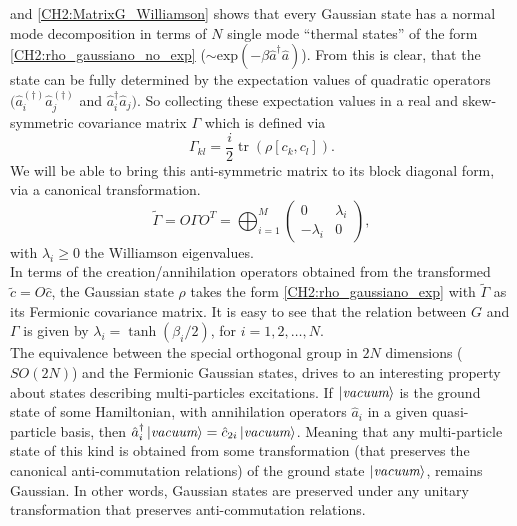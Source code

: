 and \eqref{CH2:MatrixG_Williamson} shows that every Gaussian state has a normal mode decomposition in terms of $N$ single mode ``thermal states'' of the form \eqref{CH2:rho_gaussiano_no_exp} ($\sim \text{exp}(-\beta \hat{a}^{\dagger}\hat{a})$)\cite{kraus_pairing_2009}. From this is clear, that the state can be fully determined by the expectation values of quadratic operators $(\hat{a}_i^{(\dagger)}\hat{a}_j^{(\dagger)}$ and  $\hat{a}^{\dagger}_i\hat{a}_j)$. So collecting these expectation values in a real and skew-symmetric covariance matrix $\Gamma$ which is defined via
\begin{equation}
\Gamma_{k l}=\frac{i}{2} \operatorname{tr}\left(\rho\left[c_{k}, c_{l}\right]\right).
\label{CH2:Cov_matrix_elements}
\end{equation}
\indent We will be able to bring this anti-symmetric matrix to its block diagonal form, via a canonical transformation.
\begin{equation}
\tilde{\Gamma} = O \Gamma O^{T}=\bigoplus_{i=1}^{M}\left(\begin{array}{cc}
0 & \lambda_{i} \\
-\lambda_{i} & 0
\end{array}\right),
\label{CH2:Williamson_Cov_fermionic_matrix}
\end{equation}
with $\lambda_i\geq 0$ the Williamson eigenvalues.\\
In terms of the creation/annihilation operators obtained from the transformed $\tilde{c}=O\hat{c}$, the Gaussian state $\rho$ takes the form \eqref{CH2:rho_gaussiano_exp} with $\tilde{\Gamma}$ as its Fermionic covariance matrix. It is easy to see that the relation between $G$ and $\Gamma$ is given by $\lambda_{i} = \tanh{\left(\beta_{i}/2\right)}$, for $i=1,2,\ldots,N$\cite{kraus_pairing_2009}. \\

\indent The equivalence between the special orthogonal group in $2N$ dimensions ($SO(2N)$) and the Fermionic Gaussian states, drives to an interesting  property about states describing multi-particles excitations. If $\mathinner{|{\textit{vacuum}}\rangle}$ is the ground state of some Hamiltonian, with annihilation operators $\hat{a}_{i}$ in a given quasi-particle basis, then $\hat{a}_{i}^{\dagger}\mathinner{|{\textit{vacuum}}\rangle} = \hat{c}_{2i}\mathinner{|{\textit{vacuum}}\rangle}$. Meaning that any multi-particle state of this kind is obtained from some transformation (that preserves the canonical anti-commutation relations) of the ground state $\mathinner{|{\textit{vacuum}}\rangle}$, remains Gaussian. In other words, Gaussian states are preserved under any unitary transformation that preserves anti-commutation relations.\\

